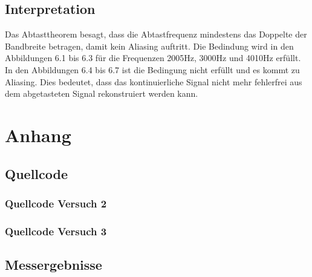 \documentclass[12pt, oneside, a4paper, \docLanguage]{report}
\begin{document}
\section{Interpretation}
\label{chap:VERSUCH_3_INTERPRETATION}
Das Abtasttheorem besagt, dass die Abtastfrequenz mindestens das Doppelte der Bandbreite betragen, damit kein Aliasing auftritt. Die Bedindung wird in den Abbildungen 6.1 bis 6.3 für die Frequenzen 2005Hz, 3000Hz und 4010Hz erfüllt. In den Abbildungen 6.4 bis 6.7 ist die Bedingung nicht erfüllt und es kommt zu Aliasing. Dies bedeutet, dass das kontinuierliche Signal nicht mehr fehlerfrei aus dem abgetasteten Signal rekonstruiert werden kann.

%
%
\renewcommand\thesection{A.\arabic{section}}
\renewcommand\thesubsection{\thesection.\arabic{subsection}}

\chapter*{Anhang}
\label{chap:APPENDIX}
\addtocounter{chapter}{1}
\setcounter{section}{0}

\section{Quellcode}
\label{chap:APPENDIX_SOURCECODE}

\subsection{Quellcode Versuch 2}
\label{chap:APPENDIX_SOURCECODE_V2}


\subsection{Quellcode Versuch 3}
\label{chap:APPENDIX_SOURCECODE_V3}


\section{Messergebnisse}
\label{chap:APPENDIX_MEASUREMENT_SOURCE}
\end{document}
